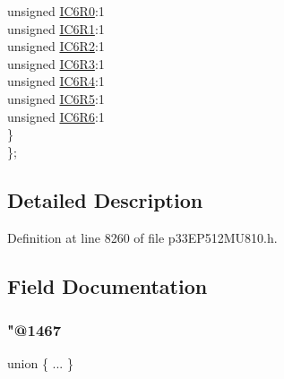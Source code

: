 \begin{DoxyCompactItemize}
\begin{tabbing}
\>\>unsigned \hyperlink{structtag_r_p_i_n_r9_b_i_t_s_a6affd48654a654430c56f9d1010f4892}{IC6R0}:1\\
\>\>unsigned \hyperlink{structtag_r_p_i_n_r9_b_i_t_s_a5c1fc68f35db8ce657ffe0465f8d74ec}{IC6R1}:1\\
\>\>unsigned \hyperlink{structtag_r_p_i_n_r9_b_i_t_s_a66a6276dcf8120a09c7c40b01a1c39c0}{IC6R2}:1\\
\>\>unsigned \hyperlink{structtag_r_p_i_n_r9_b_i_t_s_acf272453e7f9ed6aede50d7e935cae41}{IC6R3}:1\\
\>\>unsigned \hyperlink{structtag_r_p_i_n_r9_b_i_t_s_a5e29cab368d1aafa57d16e62f4419413}{IC6R4}:1\\
\>\>unsigned \hyperlink{structtag_r_p_i_n_r9_b_i_t_s_a60dde539eab1ca4fdb76931b0ee332cf}{IC6R5}:1\\
\>\>unsigned \hyperlink{structtag_r_p_i_n_r9_b_i_t_s_ab8cb15e74fe176a52b05d4e160092fec}{IC6R6}:1\\
\>\} \\
\}; \\

\end{tabbing}\end{DoxyCompactItemize}


\subsection{Detailed Description}


Definition at line 8260 of file p33\+E\+P512\+M\+U810.\+h.



\subsection{Field Documentation}
\mbox{\label{structtag_r_p_i_n_r9_b_i_t_s_a1137e660f747389d2890de8f1639cc1c}} 
\subsubsection{\texorpdfstring{"@1467}{@1467}}
{\footnotesize\ttfamily union \{ ... \} }

\mbox{\label{structtag_r_p_i_n_r9_b_i_t_s_adf71f3d8410c1f1dbbc96680a92c49af}} 
